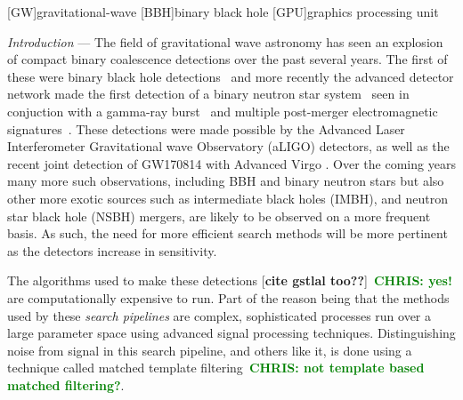 \documentclass[%
 amsmath,amssymb,
 aps,
 twocolumn,
 prl,
 reprint,
floatfix,
]{revtex4-1}
\newcommand{\chris}[1]{\textbf{\textcolor{green}{CHRIS: #1}}}
\begin{document}
[GW]{gravitational-wave}
[BBH]{binary black hole}
[GPU]{graphics processing unit}


%
%

%
%
\textit{Introduction} --- 
%
%
The field of gravitational wave astronomy has seen an explosion of compact
binary coalescence detections over the past several years. The first of these
were binary black hole detections~\cite{PhysRevLett.116.061102,
PhysRevLett.116.241103, PhysRevLett.118.221101} and more recently the advanced
detector network made the first detection of a binary neutron star
system~\cite{PhysRevLett.119.161101} seen in conjuction with a gamma-ray
burst~\cite{2017arXiv171005834L,2017arXiv171005446G,2017arXiv171005449S} and
multiple post-merger electromagnetic signatures~\cite{2017arXiv171005833L}.
These detections were made possible by the Advanced Laser Interferometer
Gravitational wave Observatory (aLIGO) detectors, as well as the recent joint
detection of GW170814 with Advanced Virgo \cite{PhysRevLett.119.141101}. Over
the coming years many more such observations, including \ac{BBH} and binary
neutron stars but also other more exotic sources such as intermediate black
holes (IMBH), and neutron star black hole (NSBH) mergers, are likely to be
observed on a more frequent basis. As such, the need for more efficient search
methods will be more pertinent as the detectors increase in sensitivity.

%
%
The algorithms used to make these detections \cite{0264-9381-33-21-215004}
[\textbf{cite gstlal too??}]~\chris{yes!} are computationally expensive to run.
Part of the reason being that the methods used by these \textit{search
pipelines} are complex, sophisticated processes run over a large parameter
space using advanced signal processing techniques. Distinguishing noise from
signal in this search pipeline, and others like it, is done using a technique
called matched template filtering~\chris{not template based matched
filtering?}. 
\end{document}
